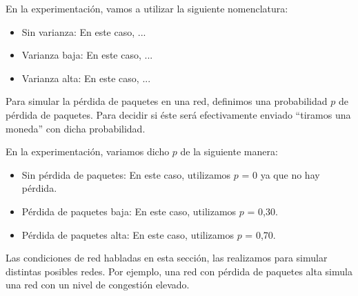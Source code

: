 En la experimentación, vamos a utilizar la siguiente nomenclatura:
\begin{itemize}
 \item Sin varianza: En este caso, ...
 \item Varianza baja: En este caso, ...
 \item Varianza alta: En este caso, ...
\end{itemize}
 
Para simular la pérdida de paquetes en una red, definimos una probabilidad $p$ de pérdida de paquetes. Para decidir si éste será efectivamente enviado “tiramos una moneda” con dicha probabilidad.

En la experimentación, variamos dicho $p$ de la siguiente manera:
\begin{itemize}
 \item Sin pérdida de paquetes: En este caso, utilizamos $p$ = 0 ya que no hay pérdida. 
 \item Pérdida de paquetes baja: En este caso, utilizamos $p$ = 0,30.
 \item Pérdida de paquetes alta: En este caso, utilizamos $p$ = 0,70.
\end{itemize}

Las condiciones de red habladas en esta sección, las realizamos para simular distintas posibles redes. Por ejemplo, una red con pérdida de paquetes alta simula una red con un nivel de congestión elevado.